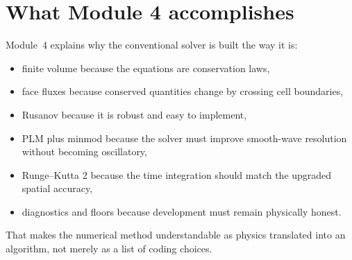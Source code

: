 \documentclass[11pt]{article}
\begin{document}
\section{What Module 4 accomplishes}
Module~4 explains why the conventional solver is built the way it is:
\begin{itemize}[leftmargin=1.8em]
    \item finite volume because the equations are conservation laws,
    \item face fluxes because conserved quantities change by crossing cell boundaries,
    \item Rusanov because it is robust and easy to implement,
    \item PLM plus minmod because the solver must improve smooth-wave resolution without becoming oscillatory,
    \item Runge--Kutta 2 because the time integration should match the upgraded spatial accuracy,
    \item diagnostics and floors because development must remain physically honest.
\end{itemize}
That makes the numerical method understandable as physics translated into an algorithm, not merely as a list of coding choices.
\end{document}
